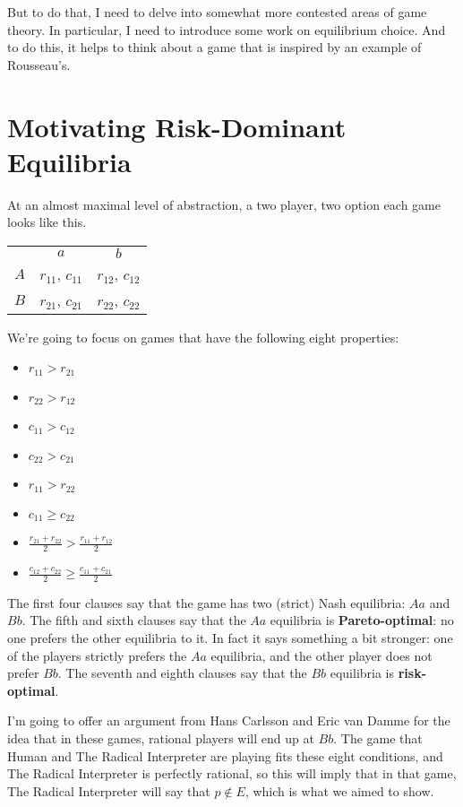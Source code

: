 \documentclass[11pt,]{book}
\providecommand{\tightlist}{%
  \setlength{\itemsep}{0pt}\setlength{\parskip}{0pt}}
\def\toprule{}
\def\bottomrule{}
\begin{document}
But to do that, I need to delve into somewhat more contested areas of game theory. In particular, I need to introduce some work on equilibrium choice. And to do this, it helps to think about a game that is inspired by an example of Rousseau's.

\hypertarget{globalgame}{%
\section{Motivating Risk-Dominant Equilibria}\label{globalgame}}

At an almost maximal level of abstraction, a two player, two option each game looks like this.

\begin{longtable}[]{@{}lcc@{}}
\toprule
\endhead
& \(a\) & \(b\)\tabularnewline
\(A\) & \(r_{11}\), \(c_{11}\) & \(r_{12}\), \(c_{12}\)\tabularnewline
\(B\) & \(r_{21}\), \(c_{21}\) & \(r_{22}\), \(c_{22}\)\tabularnewline
\bottomrule
\end{longtable}

We're going to focus on games that have the following eight properties:

\begin{itemize}
\tightlist
\item
  \(r_{11} > r_{21}\)
\item
  \(r_{22} > r_{12}\)
\item
  \(c_{11} > c_{12}\)
\item
  \(c_{22} > c_{21}\)
\item
  \(r_{11} > r_{22}\)
\item
  \(c_{11} \geq c_{22}\)
\item
  \(\frac{r_{21}+r_{22}}{2} > \frac{r_{11}+r_{12}}{2}\)
\item
  \(\frac{c_{12}+c_{22}}{2} \geq \frac{c_{11}+c_{21}}{2}\)
\end{itemize}

The first four clauses say that the game has two (strict) Nash equilibria: \(Aa\) and \(Bb\). The fifth and sixth clauses say that the \(Aa\) equilibria is \textbf{Pareto-optimal}: no one prefers the other equilibria to it. In fact it says something a bit stronger: one of the players strictly prefers the \(Aa\) equilibria, and the other player does not prefer \(Bb\). The seventh and eighth clauses say that the \(Bb\) equilibria is \textbf{risk-optimal}.

I'm going to offer an argument from Hans Carlsson and Eric van Damme \citeyearpar{CarlssonVanDamme1993} for the idea that in these games, rational players will end up at \(Bb\). The game that Human and The Radical Interpreter are playing fits these eight conditions, and The Radical Interpreter is perfectly rational, so this will imply that in that game, The Radical Interpreter will say that \(p \notin E\), which is what we aimed to show.
\end{document}
